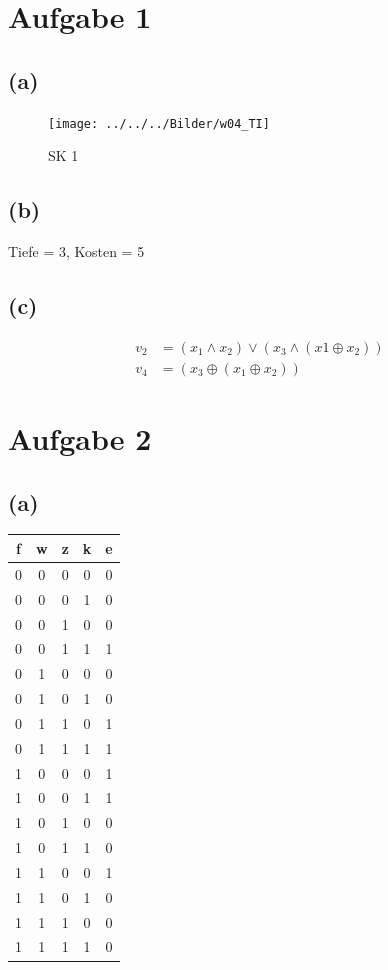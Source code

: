 \documentclass[a4paper,
  twoside, %
  headlines=2.1 %
  ]{scrartcl}
\author{\yourname}
\title{\lecture}
\subtitle{Übungsblatt \sheetnum}
\date{} %
\begin{document}
\maketitle

\section*{Aufgabe 1}
\subsection*{(a)}
\begin{figure}[h!]
\centering
\texttt{[image: ../../../Bilder/w04\_TI]}
\caption[Schaltkreis 1]{SK 1}
\label{fig:w04_TI}
\end{figure}

\subsection*{(b)}
Tiefe = 3, Kosten = 5\\
\subsection*{(c)}
\begin{align*}
	v_2 &= (x_1 \land x_2)\lor (x_3\land (x1 \oplus x_2))\\
	v_4 &= (x_3 \oplus (x_1 \oplus x_2))
\end{align*}
    
\section*{Aufgabe 2}
\subsection*{(a)} 
\begin{tabular}{c|c|c|c||c}
	f & w & z & k & e \\
	\hline
		0&0&0&0&0\\
		0&0&0&1&0\\
		0&0&1&0&0\\
		0&0&1&1&1\\
		0&1&0&0&0\\
		0&1&0&1&0\\
		0&1&1&0&1\\
		0&1&1&1&1\\
		1&0&0&0&1\\
		1&0&0&1&1\\
		1&0&1&0&0\\
		1&0&1&1&0\\
		1&1&0&0&1\\
		1&1&0&1&0\\
		1&1&1&0&0\\
		1&1&1&1&0
\end{tabular}
\end{document}
